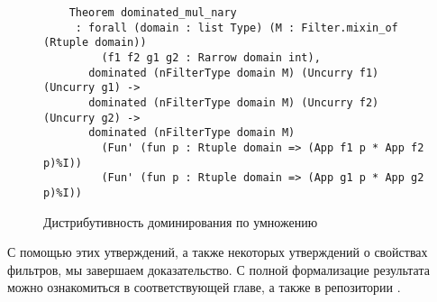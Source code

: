 \begin{figure}[H]
  \caption{Дистрибутивность доминирования по умножению}
  \label{code:dominated_mul_nary}
  \begin{verbatim}
    Theorem dominated_mul_nary
	 : forall (domain : list Type) (M : Filter.mixin_of (Rtuple domain))
         (f1 f2 g1 g2 : Rarrow domain int),
       dominated (nFilterType domain M) (Uncurry f1) (Uncurry g1) ->
       dominated (nFilterType domain M) (Uncurry f2) (Uncurry g2) ->
       dominated (nFilterType domain M)
         (Fun' (fun p : Rtuple domain => (App f1 p * App f2 p)%I))
         (Fun' (fun p : Rtuple domain => (App g1 p * App g2 p)%I))
  \end{verbatim}
\end{figure}

С помощью этих утверждений, а также некоторых утверждений о свойствах фильтров, мы завершаем доказательство.
С полной формализацие результата можно ознакомиться в соответствующей главе, а также в репозитории \cite{Grigoryants2021}.